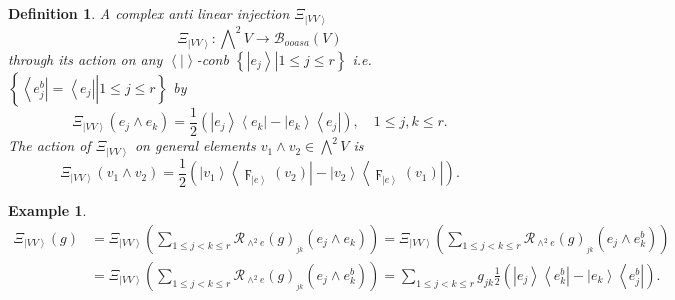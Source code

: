 \documentclass[aps,preprint]{revtex4}%
\newtheorem{definition}[theorem]{Definition}
\newtheorem{example}[theorem]{Example}
\begin{document}
\begin{definition}
A complex anti linear injection $\mathcal{\Xi}_{\left\vert VV\right\rangle }$
\begin{equation}
\mathcal{\Xi}_{\left\vert VV\right\rangle }:%
{\textstyle\bigwedge\nolimits^{2}}
V\rightarrow\mathcal{B}_{ooasa}\left(  V\right)
\end{equation}
through its action on any $\left\langle \left.  {}\right\vert \right\rangle
$-conb $\left\{  \left.  \left\vert e_{j}\right\rangle \right\vert 1\leq j\leq
r\right\}  $ i.e. $\left\{  \left.  \left\langle e_{j}^{b}\right\vert
=\left\langle e_{j}\right\vert \right\vert 1\leq j\leq r\right\}  $ by
\begin{equation}
\mathcal{\Xi}_{\left\vert VV\right\rangle }\left(  e_{j}\wedge e_{k}\right)
=\frac{1}{2}\left(  \left\vert e_{j}\right\rangle \left\langle e_{k}%
\right\vert -\left\vert e_{k}\right\rangle \left\langle e_{j}\right\vert
\right)  ,\quad1\leq j,k\leq r.
\end{equation}
The action of $\mathcal{\Xi}_{\left\vert VV\right\rangle }$ on general
elements $v_{1}\wedge v_{2}\in%
{\textstyle\bigwedge\nolimits^{2}}
V$ is
\begin{equation}
\mathcal{\Xi}_{\left\vert VV\right\rangle }\left(  v_{1}\wedge v_{2}\right)
=\frac{1}{2}\left(  \left\vert v_{1}\right\rangle \left\langle \digamma
_{\left\vert e\right\rangle }\left(  v_{2}\right)  \right\vert -\left\vert
v_{2}\right\rangle \left\langle \digamma_{\left\vert e\right\rangle }\left(
v_{1}\right)  \right\vert \right)  .
\end{equation}

\end{definition}

\begin{example}%
\begin{align}
\mathcal{\Xi}_{\left\vert VV\right\rangle }\left(  g\right)   &
=\mathcal{\Xi}_{\left\vert VV\right\rangle }\left(  \sum_{1\leq j<k\leq
r}\mathcal{R}_{\wedge^{2}e}\left(  g\right)  _{_{jk}}\left(  \overset{}{e_{j}%
\wedge e_{k}}\right)  \right)  =\mathcal{\Xi}_{\left\vert VV\right\rangle
}\left(  \sum_{1\leq j<k\leq r}\mathcal{R}_{\wedge^{2}e}\left(  g\right)
_{_{jk}}\left(  \overset{}{e_{j}\wedge e_{k}^{b}}\right)  \right) \\
&  =\mathcal{\Xi}_{\left\vert VV\right\rangle }\left(  \sum_{1\leq j<k\leq
r}\mathcal{R}_{\wedge^{2}e}\left(  g\right)  _{_{jk}}\left(  \overset{}{e_{j}%
\wedge e_{k}^{b}}\right)  \right)  =\sum_{1\leq j<k\leq r}g_{jk}\frac{1}%
{2}\left(  \left\vert e_{j}\right\rangle \left\langle e_{k}^{b}\right\vert
-\left\vert e_{k}\right\rangle \left\langle e_{j}^{b}\right\vert \right)  .
\end{align}

\end{example}
\end{document}

